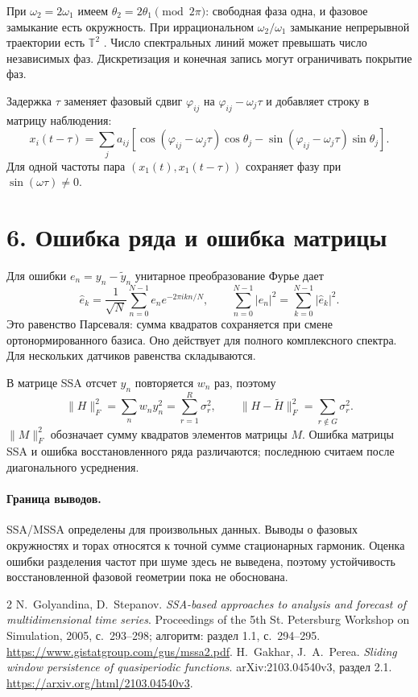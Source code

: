 \documentclass[11pt,a4paper]{article}
\begin{document}
При $\omega_2=2\omega_1$ имеем $\theta_2=2\theta_1\pmod{2\pi}$:
свободная фаза одна, и фазовое замыкание есть окружность.
При иррациональном $\omega_2/\omega_1$ замыкание непрерывной траектории
есть $\mathbb T^2$ \cite[следствие 2.3]{torus}.
Число спектральных линий может превышать число независимых фаз.
Дискретизация и конечная запись могут ограничивать покрытие фаз.

Задержка $\tau$ заменяет фазовый сдвиг $\varphi_{ij}$ на
$\varphi_{ij}-\omega_j\tau$ и добавляет строку в матрицу наблюдения:
\[
 x_i(t-\tau)=\sum_j a_{ij}\left[
 \cos(\varphi_{ij}-\omega_j\tau)\cos\theta_j
 -\sin(\varphi_{ij}-\omega_j\tau)\sin\theta_j\right].
\]
Для одной частоты пара $(x_1(t),x_1(t-\tau))$ сохраняет фазу
при $\sin(\omega\tau)\ne0$.

\section*{6. Ошибка ряда и ошибка матрицы}
Для ошибки $e_n=y_n-\widetilde y_n$ унитарное преобразование Фурье дает
\[
 \widehat e_k=\frac1{\sqrt N}\sum_{n=0}^{N-1}e_ne^{-2\pi ikn/N},\qquad
 \sum_{n=0}^{N-1}|e_n|^2=\sum_{k=0}^{N-1}|\widehat e_k|^2.
\]
Это равенство Парсеваля: сумма квадратов сохраняется при смене
ортонормированного базиса. Оно действует для полного комплексного
спектра. Для нескольких датчиков равенства складываются.

В матрице SSA отсчет $y_n$ повторяется $w_n$ раз, поэтому
\[
 \|H\|_F^2=\sum_nw_ny_n^2=\sum_{r=1}^R\sigma_r^2,\qquad
 \|H-\widetilde H\|_F^2=\sum_{r\notin G}\sigma_r^2.
\]
$\|M\|_F^2$ обозначает сумму квадратов элементов матрицы $M$.
Ошибка матрицы SSA и ошибка восстановленного ряда различаются;
последнюю считаем после диагонального усреднения.

\paragraph{Граница выводов.}
SSA/MSSA определены для произвольных данных. Выводы о фазовых окружностях
и торах относятся к точной сумме стационарных гармоник.
Оценка ошибки разделения частот при шуме здесь не выведена,
поэтому устойчивость восстановленной фазовой геометрии пока не обоснована.

\begin{thebibliography}{2}
N.~Golyandina, D.~Stepanov.
\emph{SSA-based approaches to analysis and forecast of multidimensional
 time series}. Proceedings of the 5th St. Petersburg Workshop on
Simulation, 2005, с.~293--298; алгоритм: раздел 1.1, с.~294--295.
\url{https://www.gistatgroup.com/gus/mssa2.pdf}.
H.~Gakhar, J.~A.~Perea.
\emph{Sliding window persistence of quasiperiodic functions}.
arXiv:2103.04540v3, раздел 2.1.
\url{https://arxiv.org/html/2103.04540v3}.
\end{thebibliography}
\end{document}
